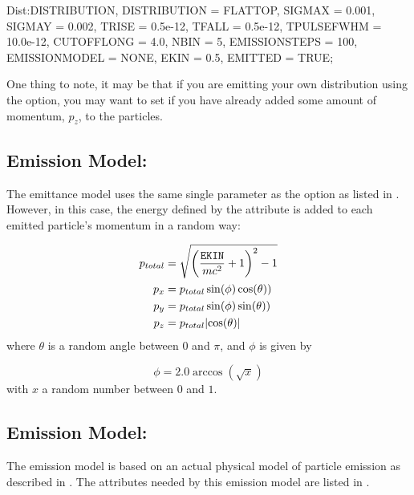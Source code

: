 \begin{example}
Dist:DISTRIBUTION, DISTRIBUTION = FLATTOP,
                   SIGMAX = 0.001,
                   SIGMAY = 0.002,
                   TRISE = 0.5e-12,
                   TFALL = 0.5e-12,
                   TPULSEFWHM = 10.0e-12,
                   CUTOFFLONG = 4.0,
                   NBIN = 5,
                   EMISSIONSTEPS = 100,
                   EMISSIONMODEL = NONE,
                   EKIN = 0.5,
                   EMITTED = TRUE;
\end{example}

One thing to note, it may be that if you are emitting your own distribution using the 
option, you may want to set  if you have already added some amount of momentum, $p_{z}$, to the
particles.

\subsection{Emission Model: }
The  emittance model uses the same single parameter as the  option as listed in
. However, in this case, the energy defined by the  attribute is
added to each emitted particle's momentum in a random way:

\begin{equation*}
  \begin{aligned}
    p_{total} &= \sqrt{\left(\frac{\keyword{EKIN}}{mc^{2}} + 1\right)^{2} - 1} \\
    p_{x} &= p_{total} \sin(\phi) \cos(\theta)) \\
    p_{y} &= p_{total} \sin(\phi) \sin(\theta)) \\
    p_{z} &= p_{total} |{\cos(\theta)}|
  \end{aligned}
\end{equation*}
where $\theta$ is a random angle between $0$ and $\pi$, and $\phi$ is given by

\begin{equation*}
  \phi = 2.0 \arccos \left( \sqrt{x} \right)
\end{equation*}
with $x$ a random number between $0$ and $1$.

\subsection{Emission Model: }
The  emission model is based on an actual physical model of particle emission as described in
\cite{flo:97, clen:2000, dowe:2009}. The attributes needed by this emission model are listed in
.

